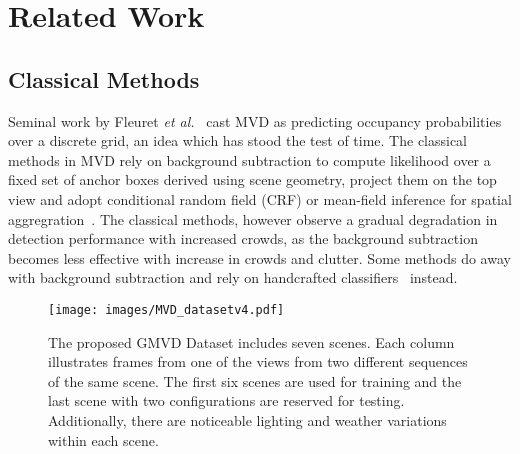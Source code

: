 \documentclass[letterpaper, 10 pt, conference]{ieeeconf}  \usepackage{times}
\newcommand{\etal}{\textit{et al.}}
\begin{document}
\section{Related Work}


\subsection{Classical Methods}
Seminal work by Fleuret \etal~\cite{Fleuret2008MulticameraPT} cast MVD as predicting occupancy probabilities over a discrete grid, an idea which has stood the test of time. The classical methods in MVD rely on background subtraction to compute likelihood over a fixed set of anchor boxes derived using scene geometry, project them on the top view and adopt conditional random field (CRF) or mean-field inference for spatial aggregration~\cite{Fleuret2008MulticameraPT,berclaz2011multiple,alahi2011sparsity}. The classical methods, however observe a gradual degradation in detection performance with increased crowds, as the background subtraction becomes less effective with increase in crowds and clutter. Some methods do away with background subtraction and rely on handcrafted classifiers~\cite{Roig2011ConditionalRF} instead. 





 \begin{figure*}[!t]
    \centering
    \texttt{[image: images/MVD\_datasetv4.pdf]}
    \caption{The proposed GMVD Dataset includes seven scenes. Each column illustrates frames from one of the views from two different sequences of the same scene. The first six scenes are used for training and the last scene with two configurations are reserved for testing. Additionally, there are noticeable lighting and weather variations within each scene.}
    \label{fig:dataset}
\end{figure*}

\begin{table*}
\centering
\small
\caption{Dataset Statistics for various MVD datasets. Our proposed GMVD dataset is the largest and most diverse dataset on a variety of metrics. Avg. coverage refers to the average number of cameras that cover each point on the ground plane. }

\label{tab:dataset-stats}
\end{table*}
\end{document}

